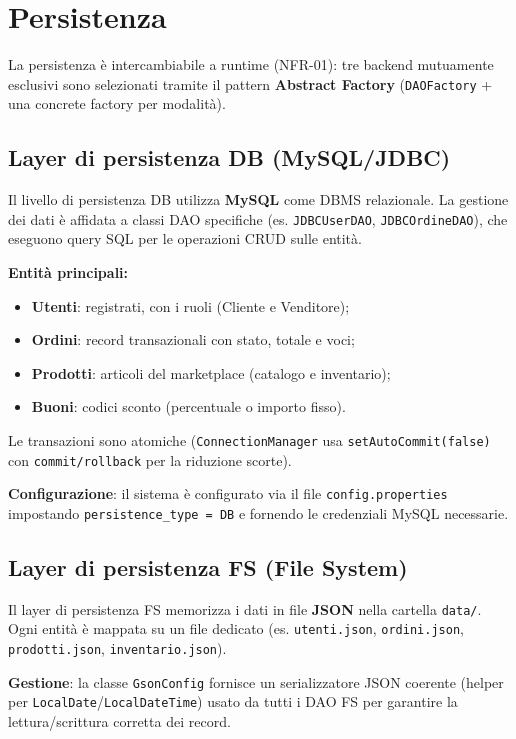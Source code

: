 \chapter{Persistenza}
\label{cap:persistenza}

La persistenza è intercambiabile a runtime (NFR-01): tre backend mutuamente
esclusivi sono selezionati tramite il pattern \textbf{Abstract Factory}
(\texttt{DAOFactory} + una concrete factory per modalità).

\section{Layer di persistenza DB (MySQL/JDBC)}
Il livello di persistenza DB utilizza \textbf{MySQL} come DBMS relazionale. La
gestione dei dati è affidata a classi DAO specifiche (es.
\texttt{JDBCUserDAO}, \texttt{JDBCOrdineDAO}), che eseguono query SQL per le
operazioni CRUD sulle entità.

\textbf{Entità principali:}
\begin{itemize}
    \item \textbf{Utenti}: registrati, con i ruoli (Cliente e Venditore);
    \item \textbf{Ordini}: record transazionali con stato, totale e voci;
    \item \textbf{Prodotti}: articoli del marketplace (catalogo e inventario);
    \item \textbf{Buoni}: codici sconto (percentuale o importo fisso).
\end{itemize}

Le transazioni sono atomiche (\texttt{ConnectionManager} usa
\texttt{setAutoCommit(false)} con \texttt{commit/rollback} per la riduzione
scorte).

\textbf{Configurazione}: il sistema è configurato via il file
\texttt{config.properties} impostando \texttt{persistence\_type = DB} e
fornendo le credenziali MySQL necessarie.

\section{Layer di persistenza FS (File System)}
Il layer di persistenza FS memorizza i dati in file \textbf{JSON} nella
cartella \texttt{data/}. Ogni entità è mappata su un file dedicato
(es. \texttt{utenti.json}, \texttt{ordini.json}, \texttt{prodotti.json},
\texttt{inventario.json}).

\textbf{Gestione}: la classe \texttt{GsonConfig} fornisce un serializzatore
JSON coerente (helper per \texttt{LocalDate}/\texttt{LocalDateTime}) usato da
tutti i DAO FS per garantire la lettura/scrittura corretta dei record.


